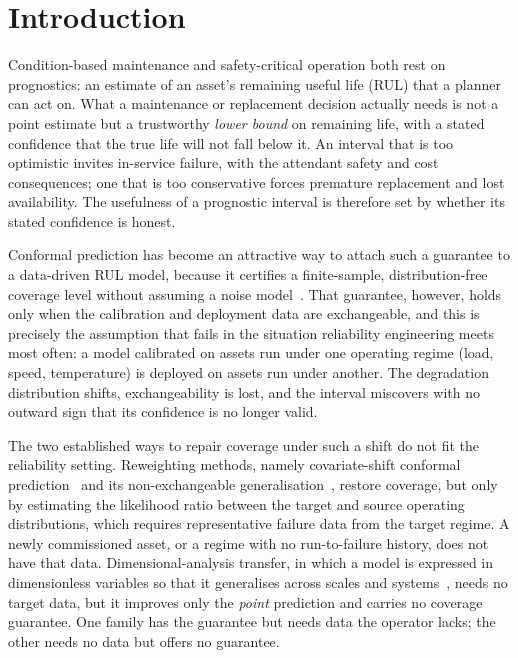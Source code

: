 \section{Introduction}\label{sec:intro}
Condition-based maintenance and safety-critical operation both rest on prognostics: an estimate of
an asset's remaining useful life (RUL) that a planner can act on. What a maintenance or replacement
decision actually needs is not a point estimate but a trustworthy \emph{lower bound} on remaining
life, with a stated confidence that the true life will not fall below it. An interval that is too
optimistic invites in-service failure, with the attendant safety and cost consequences; one that is
too conservative forces premature replacement and lost availability. The usefulness of a prognostic
interval is therefore set by whether its stated confidence is honest.

Conformal prediction has become an attractive way to attach such a guarantee to a data-driven RUL
model, because it certifies a finite-sample, distribution-free coverage level without assuming a
noise model~\cite{vovk2005algorithmic,papadopoulos2002inductive,lei2018distribution,angelopoulos2023gentle,javanmardi2023conformal}.
That guarantee, however, holds only when the calibration and deployment data are exchangeable, and
this is precisely the assumption that fails in the situation reliability engineering meets most
often: a model calibrated on assets run under one operating regime (load, speed, temperature) is
deployed on assets run under another. The degradation distribution shifts, exchangeability is lost,
and the interval miscovers with no outward sign that its confidence is no longer valid.

The two established ways to repair coverage under such a shift do not fit the reliability setting.
Reweighting methods, namely covariate-shift conformal prediction~\cite{tibshirani2019conformal} and
its non-exchangeable generalisation~\cite{barber2023conformal}, restore coverage, but only by
estimating the likelihood ratio between the target and source operating distributions, which
requires representative failure data from the target regime. A newly commissioned asset, or a regime
with no run-to-failure history, does not have that data. Dimensional-analysis transfer, in which a
model is expressed in dimensionless variables so that it generalises across scales and
systems~\cite{oppenheimer2023multiscale,therrien2024buckingham,girard2024dimensionless}, needs no
target data, but it improves only the \emph{point} prediction and carries no coverage guarantee.
One family has the guarantee but needs data the operator lacks; the other needs no data but offers
no guarantee.

